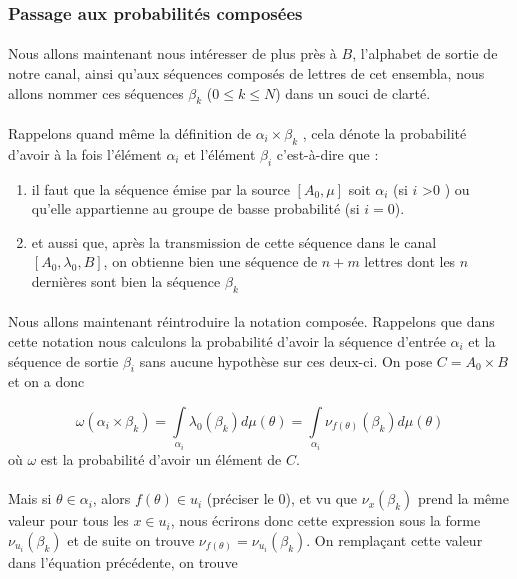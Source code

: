 \subsubsection*{Passage aux probabilités composées}
	
	\paragraph{}
	Nous allons maintenant nous intéresser de plus près à $B$, l'alphabet de sortie de notre canal, ainsi qu'aux séquences
	composés de lettres de cet ensembla, nous allons nommer ces séquences $\beta_k$ ($0 \le k \le N$) dans un souci de clarté.
	
	\paragraph{}
	Rappelons quand même la définition de $\alpha_i \times \beta_k$ , cela dénote la probabilité d'avoir à la fois l'élément $\alpha_i$ et l'élément $\beta_i$ c'est-à-dire que :
	\begin{enumerate}
		\item il faut que la séquence émise par la source $[A_0,\mu]$ soit $\alpha_i$ (si $i$ >0 ) ou qu'elle appartienne au groupe de basse probabilité (si $i=0$).
		\item et aussi que, après la transmission de cette séquence dans le canal $[A_0,\lambda_0,B]$, on obtienne bien une séquence de $n+m$ lettres dont les $n$ 
		dernières sont bien la séquence $\beta_k$
	\end{enumerate} 
	
	\paragraph{}
	Nous allons maintenant réintroduire la notation composée. Rappelons que dans cette notation nous calculons la probabilité d'avoir la séquence
	d'entrée $\alpha_i$ et la séquence de sortie $\beta_i$ sans aucune hypothèse sur ces deux-ci. On pose $C = A_0 \times B$ et on a donc
	
	
	\[\omega(\alpha_i\times\beta_k)=\int\limits_{\alpha_i}\lambda_0(\beta_k)d\mu(\theta)=\int\limits_{\alpha_i}\nu_{f(\theta)}(\beta_k)d\mu(\theta)\]
	où $\omega$ est la probabilité d'avoir un élément de $C$.
	
	\paragraph{}
	Mais si $\theta \in \alpha_i$, alors $f(\theta) \in u_i$ (préciser le 0), et vu que $\nu_x(\beta_k)$ prend la même valeur
	pour tous les $x \in u_i$, nous écrirons donc cette expression sous la forme $\nu_{u_i}(\beta_k)$ et de suite on trouve $\nu_{f(\theta)}=\nu_{u_i}(\beta_k)$.
	On remplaçant cette valeur dans l'équation précédente, on trouve
	
